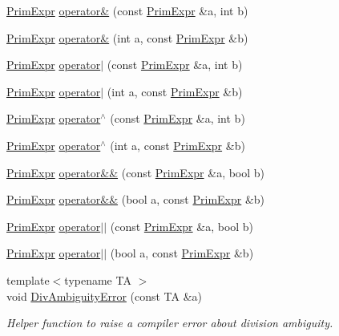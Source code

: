 \begin{DoxyCompactItemize}
\item 
\hyperlink{classtvm_1_1PrimExpr}{Prim\+Expr} \hyperlink{namespacetvm_a4ff6afc90cabb820cf2f2fda6daefd92}{operator\&} (const \hyperlink{classtvm_1_1PrimExpr}{Prim\+Expr} \&a, int b)
\item 
\hyperlink{classtvm_1_1PrimExpr}{Prim\+Expr} \hyperlink{namespacetvm_acb2697d9f746f0377975893eb080288e}{operator\&} (int a, const \hyperlink{classtvm_1_1PrimExpr}{Prim\+Expr} \&b)
\item 
\hyperlink{classtvm_1_1PrimExpr}{Prim\+Expr} \hyperlink{namespacetvm_a7c7fc3c45e6f6b52b2a1064deabd0797}{operator$\vert$} (const \hyperlink{classtvm_1_1PrimExpr}{Prim\+Expr} \&a, int b)
\item 
\hyperlink{classtvm_1_1PrimExpr}{Prim\+Expr} \hyperlink{namespacetvm_ad5ba71021b167b0a6ca2138b2c8bbace}{operator$\vert$} (int a, const \hyperlink{classtvm_1_1PrimExpr}{Prim\+Expr} \&b)
\item 
\hyperlink{classtvm_1_1PrimExpr}{Prim\+Expr} \hyperlink{namespacetvm_a82dc2fe21e7a64be5a1b11c2a8775d31}{operator$^\wedge$} (const \hyperlink{classtvm_1_1PrimExpr}{Prim\+Expr} \&a, int b)
\item 
\hyperlink{classtvm_1_1PrimExpr}{Prim\+Expr} \hyperlink{namespacetvm_a6f638564e5e4d1023096523800f2579e}{operator$^\wedge$} (int a, const \hyperlink{classtvm_1_1PrimExpr}{Prim\+Expr} \&b)
\item 
\hyperlink{classtvm_1_1PrimExpr}{Prim\+Expr} \hyperlink{namespacetvm_aca62d5095a23e0e24db1d6611d118eab}{operator\&\&} (const \hyperlink{classtvm_1_1PrimExpr}{Prim\+Expr} \&a, bool b)
\item 
\hyperlink{classtvm_1_1PrimExpr}{Prim\+Expr} \hyperlink{namespacetvm_a3fc66f0c6cd2135365cd24917d931abe}{operator\&\&} (bool a, const \hyperlink{classtvm_1_1PrimExpr}{Prim\+Expr} \&b)
\item 
\hyperlink{classtvm_1_1PrimExpr}{Prim\+Expr} \hyperlink{namespacetvm_a873bb60c71f37cbb743e21797a53ba06}{operator$\vert$$\vert$} (const \hyperlink{classtvm_1_1PrimExpr}{Prim\+Expr} \&a, bool b)
\item 
\hyperlink{classtvm_1_1PrimExpr}{Prim\+Expr} \hyperlink{namespacetvm_a1a3f9ad4d0e25eee9c0b3a9c83114bc0}{operator$\vert$$\vert$} (bool a, const \hyperlink{classtvm_1_1PrimExpr}{Prim\+Expr} \&b)
\item 
{\footnotesize template$<$typename TA $>$ }\\void \hyperlink{namespacetvm_a31e7a3e4a160a1d048e3ba741966f1a8}{Div\+Ambiguity\+Error} (const TA \&a)
\begin{DoxyCompactList}\small\item\em Helper function to raise a compiler error about division ambiguity. \end{DoxyCompactList}\item 

\end{DoxyCompactItemize}
